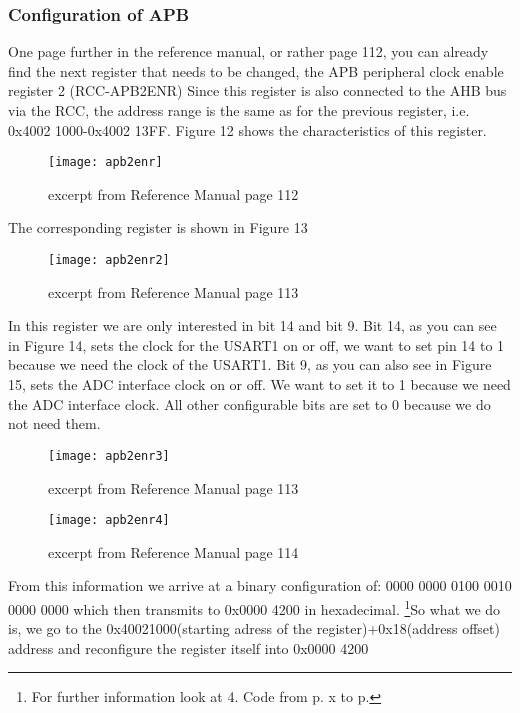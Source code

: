 \documentclass[11pt]{scrartcl}
\begin{document}
	\subsubsection{Configuration of APB}
One page further in the reference manual, or rather page 112, you can already find the next register that needs to be changed, the APB peripheral clock enable register 2 (RCC-APB2ENR) Since this register is also connected to the AHB bus via the RCC, the address range is the same as for the previous register, i.e. 0x4002 1000-0x4002 13FF. Figure 12 shows the characteristics of this register.
\begin{figure}[h]
		\centering
		\texttt{[image: apb2enr]}
		\caption{excerpt from Reference Manual page 112}
\end{figure}
\newline
The corresponding register is shown in Figure 13
\begin{figure}[h]
		\centering
		\texttt{[image: apb2enr2]}
		\caption{excerpt from Reference Manual page 113}
\end{figure}
\newline
In this register we are only interested in bit 14 and bit 9. Bit 14, as you can see in Figure 14, sets the clock for the USART1 on or off, we want to set pin 14 to 1 because we need the clock of the USART1. Bit 9, as you can also see in Figure 15, sets the ADC interface clock on or off. We want to set it to 1 because we need the ADC interface clock. All other configurable bits are set to 0 because we do not need them.
\begin{figure}[h]
		\centering
		\texttt{[image: apb2enr3]}
		\caption{excerpt from Reference Manual page 113}
\end{figure}
\newpage
\begin{figure}[h]
		\centering
		\texttt{[image: apb2enr4]}
		\caption{excerpt from Reference Manual page 114}
\end{figure}
From this information we arrive at a binary configuration of:  0000 0000 0100 0010 0000 0000 which then transmits to \newline
0x0000 4200 in hexadecimal.
\newline\newline
\footnote{\label{foot:16}For further information look at 4. Code from p. x to p.}So what we do is, we go to the 0x40021000(starting adress of the register)+0x18(address offset) address and reconfigure the register itself into 0x0000 4200
\end{document}
